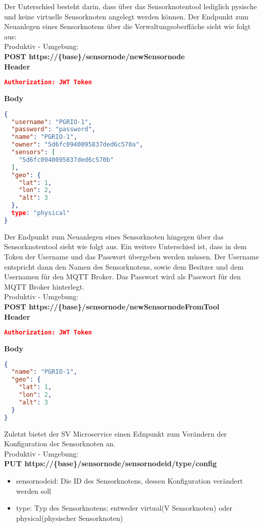 Der Unterschied besteht darin, dass über das Sensorknotentool lediglich pysische und keine virtuelle Sensorknoten angelegt werden können.
Der Endpunkt zum Neuanlegen eines Sensorknotens über die Verwaltungsoberfläche sieht wie folgt aus:\\
Produktiv - Umgebung:
\\
\textbf{POST https://\{base\}/sensornode/newSensornode}
\\
\textbf{Header}
\begin{lstlisting}[language=json,firstnumber=1,basicstyle=\footnotesize]
Authorization: JWT Token
\end{lstlisting}
\textbf{Body}
\begin{lstlisting}[language=json,firstnumber=1,basicstyle=\footnotesize]
{
  "username": "PGRIO-1",
  "password": "password",
  "name": "PGRIO-1",
  "owner": "5d6fc0940095837ded6c570a",
  "sensors": [
    "5d6fc0940095837ded6c570b"	
  ],
  "geo": {
    "lat": 1,
    "lon": 2,
    "alt": 3
  },
  type: "physical"
}
\end{lstlisting}
Der Endpunkt zum Neuanlegen eines Sensorknoten hingegen über das Sensorknotentool sieht wie folgt aus.
Ein weitere Unterschied ist, dass in dem Token der Username und das Passwort übergeben werden müssen.
Der Username entspricht dann den Namen des Sensorknotens, sowie dem Besitzer und dem Usernamen für den MQTT Broker.
Das Passwort wird als Passwort für den MQTT Broker hinterlegt.
\\
Produktiv - Umgebung:
\\
\textbf{POST https://\{base\}/sensornode/newSensornodeFromTool}
\\
\textbf{Header}
\begin{lstlisting}[language=json,firstnumber=1,basicstyle=\footnotesize]
Authorization: JWT Token
\end{lstlisting}
\textbf{Body}
\begin{lstlisting}[language=json,firstnumber=1,basicstyle=\footnotesize]
{
  "name": "PGRIO-1",
  "geo": {
    "lat": 1,
    "lon": 2,
    "alt": 3
  }
}
\end{lstlisting}
Zuletzt bietet der SV Microservice einen Ednpunkt zum Verändern der Konfiguration der Sensorknoten an.
\\
Produktiv - Umgebung:
\\
\textbf{PUT https://\{base\}/sensornode/sensornodeid/type/config}
\begin{itemize}
	\item sensornodeid: Die ID des Sensorknotens, dessen Konfiguration verändert werden soll
	\item type: Typ des Sensorknotens; entweder virtual(V Sensorknoten) oder physical(physischer Sensorknoten)
\end{itemize}
